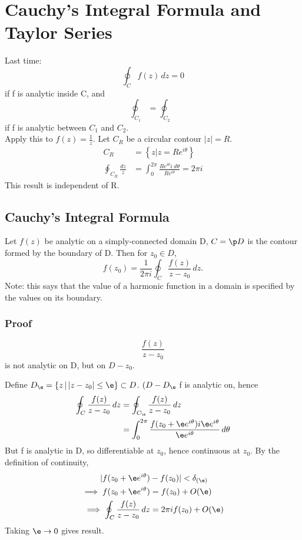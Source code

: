 \documentclass[a4paper, 11pt, normalem]{report}
\begin{document}
\chapter{Cauchy's Integral Formula and Taylor Series}
Last time:
\begin{equation}
    \oint_C f(z)\,dz = 0
\end{equation}
if f is analytic inside C, and
\begin{equation}
    \oint_{C_1} = \oint_{C_2}
\end{equation}
if f is analytic between $C_1$ and $C_2$. \\
Apply this to $f(z) = \frac{1}{z}$. Let $C_R$ be a circular contour $|z| = R$.
\begin{align}
    C_R &= \left\{z | z = Re^{i\theta}\right\} \\
    \oint_{C_R} \frac{dz}{z} &= \int_0^{2\pi} \frac{Re^{i\theta}i\;d\theta}{Re^{i\theta}} = 2\pi i
\end{align}
This result is independent of R.

\section{Cauchy's Integral Formula}
Let $f(z)$ be analytic on a simply-connected domain D, $C = \p D$ is the contour formed by the boundary of D.
Then for $z_0 \in D$,
\begin{equation}
    f(z_0) = \frac{1}{2\pi i}\oint_C \frac{f(z)}{z - z_0}\,dz.
\end{equation}
Note: this says that the value of a harmonic function in a domain is specified by the values on its boundary.

\subsection{Proof}
\begin{equation}
    \frac{f(z)}{z - z_0}
\end{equation}
is not analytic on D, but on $D - z_0$.

Define $D_\e = \{z\, |\, |z-z_0| \leq \e\} \subset D$.
$(D - D_\e$ f is analytic on, hence
\begin{align}
    \oint_C \frac{f(z)}{z - z_0}\,dz &= \oint_{C_\e} \frac{f(z)}{z - z_0}\,dz \\
                                     &= \int_{0}^{2\pi} \frac{f(z_0 + \e e^{i\theta})i\e e^{i\theta}}{\e e^{i\theta}}\,d\theta
\end{align}
But f is analytic in D, so differentiable at $z_0$, hence continuous at $z_0$.
By the definition of continuity,
\begin{align}
    |f(z_0 + \e e^{i\theta}) &- f(z_0)| < \delta_{(\e)} \\
    \implies f(z_0 + \e e^{i\theta}) &= f(z_0) + O(\e) \\
    \implies \oint_{C} \frac{f(z)}{z - z_0}\,dz &= 2\pi if(z_0) + O(\e)
\end{align}
Taking $\e \to 0$ gives result.
\end{document}
